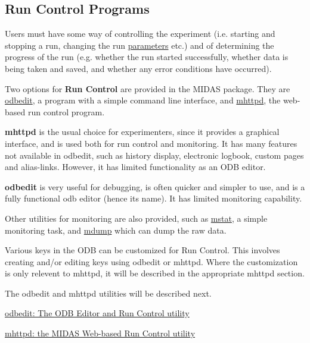 \label{index_end}
\hypertarget{index_end}{}
  \par
 \subsection{Run Control Programs}\label{RC_run_control}
\par
  \par


Users must have some way of controlling the experiment (i.e. starting and stopping a run, changing the run \hyperlink{structparameters}{parameters} etc.) and of determining the progress of the run (e.g. whether the run started successfully, whether data is being taken and saved, and whether any error conditions have occurred). \par
 Two options for {\bfseries  Run Control } are provided in the MIDAS package. They are \hyperlink{RC_odbedit_utility}{odbedit}, a program with a simple command line interface, and \hyperlink{RC_mhttpd_utility}{mhttpd}, the web-\/based run control program. \par
 {\bfseries mhttpd} is the usual choice for experimenters, since it provides a graphical interface, and is used both for run control and monitoring. It has many features not available in odbedit, such as history display, electronic logbook, custom pages and alias-\/links. However, it has limited functionality as an ODB editor. \par
 {\bfseries odbedit} is very useful for debugging, is often quicker and simpler to use, and is a fully functional odb editor (hence its name). It has limited monitoring capability. \par
 Other utilities for monitoring are also provided, such as \hyperlink{RC_Monitor_RC_mstat_utility}{mstat}, a simple monitoring task, and \hyperlink{RC_Monitor_RC_mdump_utility}{mdump} which can dump the raw data. \par


Various keys in the ODB can be customized for Run Control. This involves creating and/or editing keys using odbedit or mhttpd. Where the customization is only relevent to mhttpd, it will be described in the appropriate mhttpd section.

The odbedit and mhttpd utilities will be described next.


\begin{DoxyItemize}
\item \hyperlink{RC_odbedit}{odbedit: The ODB Editor and Run Control utility}
\item \hyperlink{RC_mhttpd}{mhttpd: the MIDAS Web-\/based Run Control utility} \par
 \par

\end{DoxyItemize}

